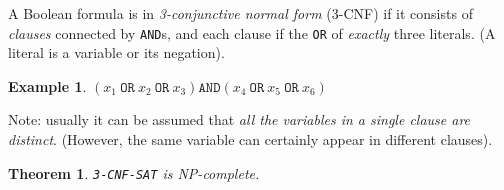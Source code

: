 \documentclass[12pt]{article}
\theoremstyle{plain}
\newtheorem{theorem}{Theorem}[subsection]
\theoremstyle{definition}
\newtheorem*{ex*}{Example}
\begin{document}
A Boolean formula is in \emph{3-conjunctive normal form} (3-CNF) if it consists of \emph{clauses} connected by \texttt{AND}s, and each clause if the \texttt{OR} of \emph{exactly} three literals.
(A literal is a variable or its negation).

\begin{ex*}
$\left(x_{1}~\texttt{OR}~x_{2}~\texttt{OR}~x_{3}\right)\texttt{AND}\left(x_{4}~\texttt{OR}~x_{5}~\texttt{OR}~x_{6}\right)$
\end{ex*}

Note: usually it can be assumed that \emph{all the variables in a single clause are distinct}.
(However, the same variable can certainly appear in different clauses).

\begin{theorem}
\texttt{3-CNF-SAT} is NP-complete.
\end{theorem}
\end{document}
